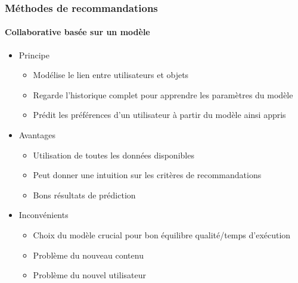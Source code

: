 \documentclass[11pt,sans]{beamer}
\begin{document}
    \begin{frame}
        \frametitle{M\'ethodes de recommandations}
        \framesubtitle{Collaborative bas\'ee sur un modèle}

        \begin{itemize}
            \item Principe
                \begin{itemize}
                    \item Mod\'elise le lien entre utilisateurs et objets
                    \item Regarde l'historique complet pour apprendre les
                        paramètres du modèle
                    \item Pr\'edit les pr\'ef\'erences d'un utilisateur à
                        partir du modèle ainsi appris
                \end{itemize}
            \item Avantages
                \begin{itemize}
                    \item Utilisation de toutes les donn\'ees disponibles
                    \item Peut donner une intuition sur les critères de
                        recommandations
                    \item Bons r\'esultats de pr\'ediction
                \end{itemize}
            \item Inconv\'enients
                \begin{itemize}
                    \item Choix du modèle crucial pour bon \'equilibre
                        qualit\'e/temps d'ex\'ecution
                    \item Problème du nouveau contenu
                    \item Problème du nouvel utilisateur
                \end{itemize}
        \end{itemize}
    \end{frame}

\end{document}
